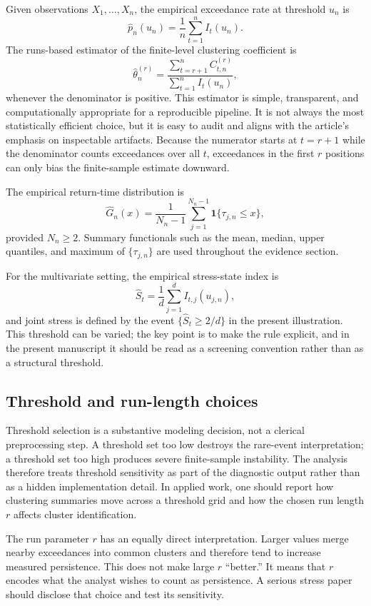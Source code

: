 \documentclass[11pt]{article}
\begin{document}
Given observations $X_1,\dots,X_n$, the empirical exceedance rate at threshold $u_n$ is
\[
\widehat{p}_n(u_n)=\frac{1}{n}\sum_{t=1}^{n}I_t(u_n).
\]
The runs-based estimator of the finite-level clustering coefficient is
\[
\widehat{\theta}_n^{(r)}=
\frac{\sum_{t=r+1}^{n} C_{t,n}^{(r)}}{\sum_{t=1}^{n} I_t(u_n)},
\]
whenever the denominator is positive. This estimator is simple, transparent, and computationally appropriate for a reproducible pipeline. It is not always the most statistically efficient choice, but it is easy to audit and aligns with the article's emphasis on inspectable artifacts. Because the numerator starts at $t=r+1$ while the denominator counts exceedances over all $t$, exceedances in the first $r$ positions can only bias the finite-sample estimate downward.

The empirical return-time distribution is
\[
\widehat{G}_n(x)=\frac{1}{N_n-1}\sum_{j=1}^{N_n-1}\mathbf{1}\{\tau_{j,n}\le x\},
\]
provided $N_n\ge 2$. Summary functionals such as the mean, median, upper quantiles, and maximum of $\{\tau_{j,n}\}$ are used throughout the evidence section.

For the multivariate setting, the empirical stress-state index is
\[
\widehat{S}_t=\frac{1}{d}\sum_{j=1}^{d}I_{t,j}(u_{j,n}),
\]
and joint stress is defined by the event $\{\widehat{S}_t \geq 2/d\}$ in the present illustration. This threshold can be varied; the key point is to make the rule explicit, and in the present manuscript it should be read as a screening convention rather than as a structural threshold.

\subsection{Threshold and run-length choices}

Threshold selection is a substantive modeling decision, not a clerical preprocessing step. A threshold set too low destroys the rare-event interpretation; a threshold set too high produces severe finite-sample instability. The analysis therefore treats threshold sensitivity as part of the diagnostic output rather than as a hidden implementation detail. In applied work, one should report how clustering summaries move across a threshold grid and how the chosen run length $r$ affects cluster identification.

The run parameter $r$ has an equally direct interpretation. Larger values merge nearby exceedances into common clusters and therefore tend to increase measured persistence. This does not make large $r$ ``better.'' It means that $r$ encodes what the analyst wishes to count as persistence. A serious stress paper should disclose that choice and test its sensitivity.
\end{document}
